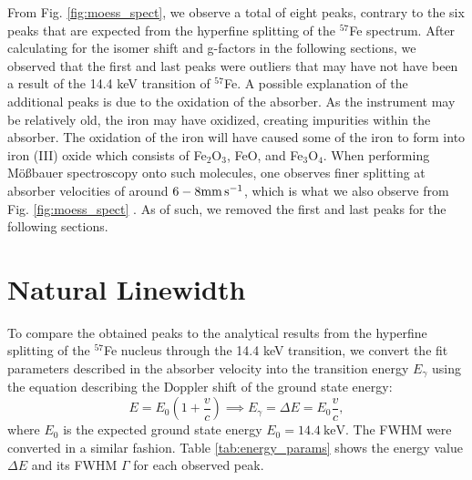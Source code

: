 \documentclass[a4paper]{report}
\numberwithin{equation}{section}
\begin{document}
From Fig. \ref{fig:moess_spect}, we observe a total of eight peaks, contrary to the 
six peaks that are expected from the hyperfine splitting of the $^{57}$Fe spectrum. After calculating for the isomer shift and 
g-factors in the following sections, we observed that the first and last peaks were outliers that may have not have been a result of  
 the 14.4 keV transition of $^{57}$Fe. 
A possible explanation of the additional peaks is due to the oxidation of the absorber. As the instrument may be relatively old,
the iron may have oxidized, creating impurities within the absorber. The oxidation of the iron will have caused some of the iron
to form into iron (III) oxide which consists of Fe$_2$O$_3$, FeO, and Fe$_3$O$_4$. When performing M\"o{\ss}bauer spectroscopy onto such molecules, 
one observes finer splitting at absorber velocities of around $6-8\si[]{\milli\metre\per\second}$, which is what we also 
observe from Fig. \ref{fig:moess_spect} \cite{Winsett2019}. As of such, we removed the first and last peaks for the following 
sections. \par 

\section{Natural Linewidth}

To compare the obtained peaks to the analytical results from the hyperfine splitting of the $^{57}$Fe nucleus through the 14.4 keV
transition, we convert the fit parameters described in the absorber velocity into the transition energy $E_\gamma$ using the 
equation describing the Doppler shift of the ground state energy: 
\begin{equation}
    E = E_0 \left(1 + \frac{v}{c}\right) \implies E_\gamma = \Delta E = E_0\frac{v}{c},
\end{equation}
where $E_0$ is the expected ground state energy $E_0 = \SI{14.4}{\kilo\electronvolt}$. The FWHM were converted in a similar 
fashion. Table \ref{tab:energy_params} shows the energy value $\Delta E$ and its 
FWHM $\Gamma$ for each observed peak. 
\end{document}
